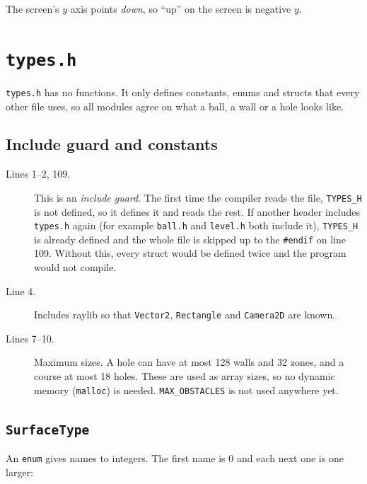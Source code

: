 \documentclass[11pt,a4paper]{article}
\newcommand{\code}[3]{}
\begin{document}
The screen's $y$ axis points \emph{down}, so ``up'' on the screen is negative $y$.

\section{\texttt{types.h}}

\texttt{types.h} has no functions. It only defines constants, enums and structs that every other
file uses, so all modules agree on what a ball, a wall or a hole looks like.

\subsection{Include guard and constants}

\code{types.h}{1}{10}

\begin{description}
  \item[Lines 1--2, 109.] This is an \emph{include guard}. The first time the compiler reads the file,
  \texttt{TYPES\_H} is not defined, so it defines it and reads the rest. If another header includes
  \texttt{types.h} again (for example \texttt{ball.h} and \texttt{level.h} both include it), \texttt{TYPES\_H}
  is already defined and the whole file is skipped up to the \texttt{\#endif} on line 109. Without this,
  every struct would be defined twice and the program would not compile.
  \item[Line 4.] Includes raylib so that \texttt{Vector2}, \texttt{Rectangle} and \texttt{Camera2D} are known.
  \item[Lines 7--10.] Maximum sizes. A hole can have at most 128 walls and 32 zones, and a course at most
  18 holes. These are used as array sizes, so no dynamic memory (\texttt{malloc}) is needed.
  \texttt{MAX\_OBSTACLES} is not used anywhere yet.
\end{description}

\subsection{\texttt{SurfaceType}}

\code{types.h}{12}{24}

An \texttt{enum} gives names to integers. The first name is 0 and each next one is one larger:
\end{document}
